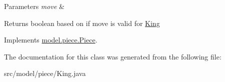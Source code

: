 \begin{DoxyParams}{Parameters}
{\em move} & \\
\hline
\end{DoxyParams}
\begin{DoxyReturn}{Returns}
boolean based on if move is valid for \hyperlink{classmodel_1_1piece_1_1_king}{King} 
\end{DoxyReturn}


Implements \hyperlink{classmodel_1_1piece_1_1_piece_af7ce06755c9f20f3481796ca5b512849}{model.\-piece.\-Piece}.



The documentation for this class was generated from the following file\-:\begin{DoxyCompactItemize}
\item 
src/model/piece/King.\-java\end{DoxyCompactItemize}
